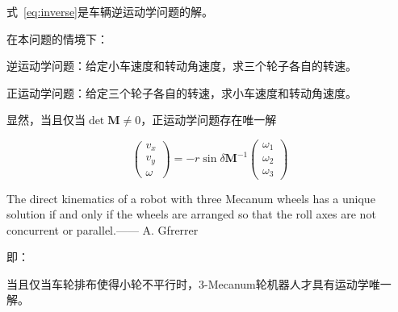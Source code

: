 式~\ref{eq:inverse}是车辆逆运动学问题的解。

在本问题的情境下：

\begin{definition}
    逆运动学问题：给定小车速度和转动角速度，求三个轮子各自的转速。
\end{definition}

\begin{definition}
    正运动学问题：给定三个轮子各自的转速，求小车速度和转动角速度。
\end{definition}

显然，当且仅当$\operatorname{det} \mathbf{M} \neq 0$，正运动学问题存在唯一解

\begin{equation}
    \left(\begin{array}{c}
    {v_{x}} \\
    {v_{y}} \\
    {\omega}
    \end{array}\right)=-r \sin \delta \mathbf{M}^{-1}\left(\begin{array}{c}
    {\omega_{1}} \\
    {\omega_{2}} \\
    {\omega_{3}}
    \end{array}\right)
\end{equation}

\begin{theorem}\label{the:theorem-en}
    The direct kinematics of a robot with three Mecanum wheels has a unique solution if and only if the wheels are arranged so that the roll axes are not concurrent or parallel.\hfill —— A. Gfrerrer
\end{theorem}

即：

\begin{theorem}\label{the:theorem-cn}
    当且仅当车轮排布使得小轮不平行时，3-Mecanum轮机器人才具有运动学唯一解。
\end{theorem}

